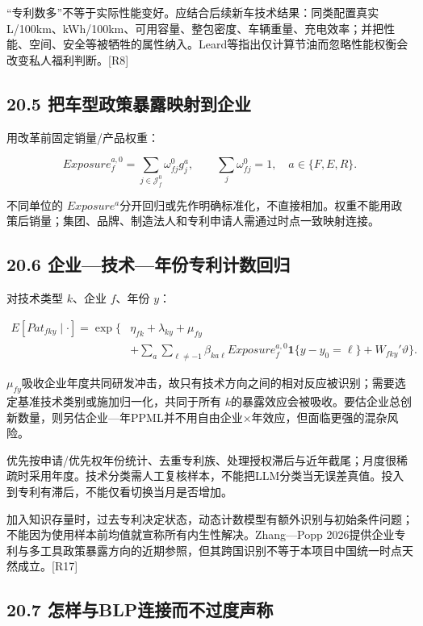\documentclass[
  11pt,
]{article}
\begin{document}
``专利数多''不等于实际性能变好。应结合后续新车技术结果：同类配置真实L/100km、kWh/100km、可用容量、整包密度、车辆重量、充电效率；并把性能、空间、安全等被牺牲的属性纳入。Leard等指出仅计算节油而忽略性能权衡会改变私人福利判断。{[}R8{]}

\subsection{20.5
把车型政策暴露映射到企业}\label{ux628aux8f66ux578bux653fux7b56ux66b4ux9732ux6620ux5c04ux5230ux4f01ux4e1a}

用改革前固定销量/产品权重：

\[
Exposure_{f}^{a,0}
=\sum_{j\in\mathcal J_f^0}\omega_{fj}^0g_j^a,
\qquad \sum_j\omega_{fj}^0=1,
\quad a\in\{F,E,R\}.
\tag{92}
\]

不同单位的
\(Exposure^a\)分开回归或先作明确标准化，不直接相加。权重不能用政策后销量；集团、品牌、制造法人和专利申请人需通过时点一致映射连接。

\subsection{20.6
企业---技术---年份专利计数回归}\label{ux4f01ux4e1aux6280ux672fux5e74ux4efdux4e13ux5229ux8ba1ux6570ux56deux5f52}

对技术类型 \(k\)、企业 \(f\)、年份 \(y\)：

\[
\begin{aligned}
E[Pat_{fky}\mid\cdot]=\exp\{&\eta_{fk}+\lambda_{ky}+\mu_{fy}\\
&+\sum_a\sum_{\ell\ne-1}
\beta_{ka\ell}Exposure_f^{a,0}
\mathbf1\{y-y_0=\ell\}+W_{fky}'\vartheta\}.
\end{aligned} \tag{93}
\]

\(\mu_{fy}\)吸收企业年度共同研发冲击，故只有技术方向之间的相对反应被识别；需要选定基准技术类别或施加归一化，共同于所有
\(k\)的暴露效应会被吸收。要估企业总创新数量，则另估企业---年PPML并不用自由企业×年效应，但面临更强的混杂风险。

优先按申请/优先权年份统计、去重专利族、处理授权滞后与近年截尾；月度很稀疏时采用年度。技术分类需人工复核样本，不能把LLM分类当无误差真值。投入到专利有滞后，不能仅看切换当月是否增加。

加入知识存量时，过去专利决定状态，动态计数模型有额外识别与初始条件问题；不能因为使用样本前均值就宣称所有内生性解决。Zhang---Popp
2026提供企业专利与多工具政策暴露方向的近期参照，但其跨国识别不等于本项目中国统一时点天然成立。{[}R17{]}

\subsection{20.7
怎样与BLP连接而不过度声称}\label{ux600eux6837ux4e0eblpux8fdeux63a5ux800cux4e0dux8fc7ux5ea6ux58f0ux79f0}
\end{document}
